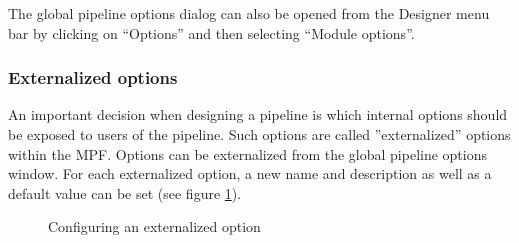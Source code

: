 \documentclass[11pt,fleqn,a4paper]{article}
\newcommand{\Figure}[4][optional,]{
  \begin{figure}[#1]
    \begin{center}
      \resizebox*{!}{#4\height}{\texttt{[image: \#2]}}
      \caption{#3 \label{#2}}
    \end{center}
  \end{figure}
}
\begin{document}
\medskip
The global pipeline options dialog can also be opened from the Designer menu bar by clicking on ``Options'' and then selecting ``Module options''.

\subsubsection*{Externalized options}

An important decision when designing a pipeline is which internal options should be exposed to users of the pipeline. Such options are called ''externalized'' options within the MPF. Options can be externalized from the global pipeline options window. For each externalized option, a new name and description as well as a default value can be set (see figure \ref{desg3.eps}).

\Figure[!ht]{desg3.eps}{ Configuring an externalized option}{0.5}

  \label{lastpage}
\end{document}
